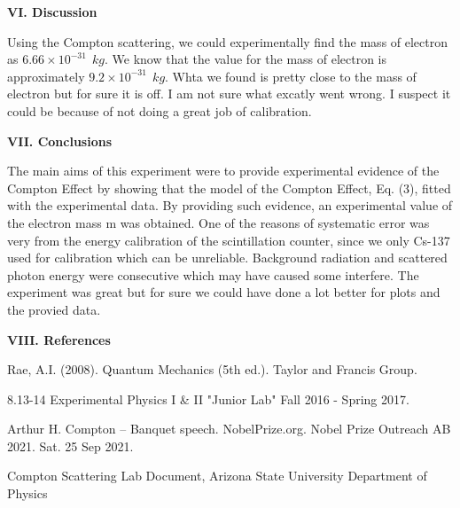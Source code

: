 \documentclass[fleqn]{article}
\begin{document}
  \pagebreak

  \textbf{VI. Discussion}

  \vspace{10px}

  Using the Compton scattering, we could experimentally find the mass of electron as $6.66 \times 10^{-31} ~~ kg$. We know that
  the value for the mass of electron is approximately $9.2 \times 10^{-31} ~~ kg$. Whta we found is pretty close to the mass of electron
  but for sure it is off. I am not sure what excatly went wrong. I suspect it could be because of not doing a great job of calibration.   

  \vspace{30px}

  \textbf{VII. Conclusions}

  \vspace{10px}

  The main aims of this experiment were to provide experimental evidence of the Compton Effect by showing that the model of the Compton Effect,
  Eq. (3), fitted with the experimental data. By providing such evidence, an experimental value of the electron mass m was obtained.
  One of the reasons of systematic error was very from the energy calibration of the scintillation counter, since we 
  only Cs-137 used for calibration which can be unreliable. Background radiation and scattered photon energy were consecutive
  which may have caused some interfere. The experiment was great but for sure we could have done a lot better for plots and the provied data.  

  \vspace{30px}

  \textbf{VIII. References}

  \vspace{15px}

  Rae, A.I. (2008). Quantum Mechanics (5th ed.). Taylor and Francis Group.

  \vspace{5px}

  8.13-14 Experimental Physics I \& II "Junior Lab" Fall 2016 - Spring 2017.

  \vspace{5px}

  Arthur H. Compton – Banquet speech. NobelPrize.org. Nobel Prize Outreach AB 2021. Sat. 25 Sep 2021.

  \vspace{5px}

  Compton Scattering Lab Document, Arizona State University Department of Physics
\end{document}
